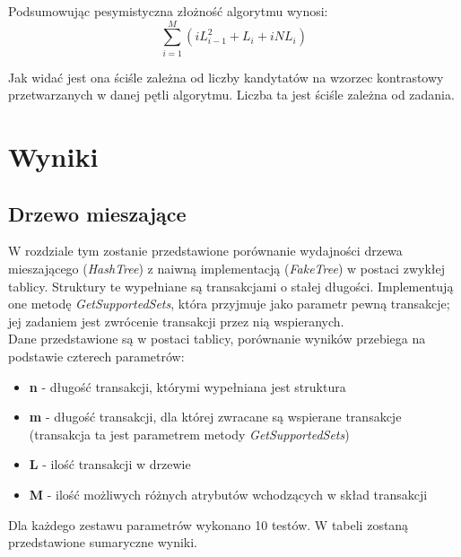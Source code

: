 \documentclass[a4paper,12pt]{article}
\begin{document}
Podsumowując pesymistyczna złożność algorytmu wynosi:
$$ \sum_{i=1}^M (iL_{i-1}^2 + L_i + iNL_i) $$

Jak widać jest ona ściśle zależna od liczby kandytatów na wzorzec kontrastowy przetwarzanych w danej pętli algorytmu. Liczba ta jest ściśle zależna od zadania.


\section{Wyniki}

\subsection{Drzewo mieszające}

W rozdziale tym zostanie przedstawione porównanie wydajności drzewa mieszającego (\textit{HashTree}) z naiwną implementacją (\textit{FakeTree}) w postaci zwykłej tablicy. Struktury te wypełniane są transakcjami o stałej długości. Implementują one metodę \textit{GetSupportedSets}, która przyjmuje jako parametr pewną transakcje; jej zadaniem jest zwrócenie transakcji przez nią wspieranych. \\
Dane przedstawione są w postaci tablicy, porównanie wyników przebiega na podstawie czterech parametrów:
\begin{itemize}
\item {\bf n} - długość transakcji, którymi wypełniana jest struktura
\item {\bf m} - długość transakcji, dla której zwracane są wspierane transakcje (transakcja ta jest parametrem metody \textit{GetSupportedSets})
\item {\bf L} - ilość transakcji w drzewie
\item {\bf M} - ilość możliwych różnych atrybutów wchodzących w skład transakcji
\end{itemize}

Dla każdego zestawu parametrów wykonano 10 testów. W tabeli zostaną przedstawione sumaryczne wyniki. \\
\end{document}
